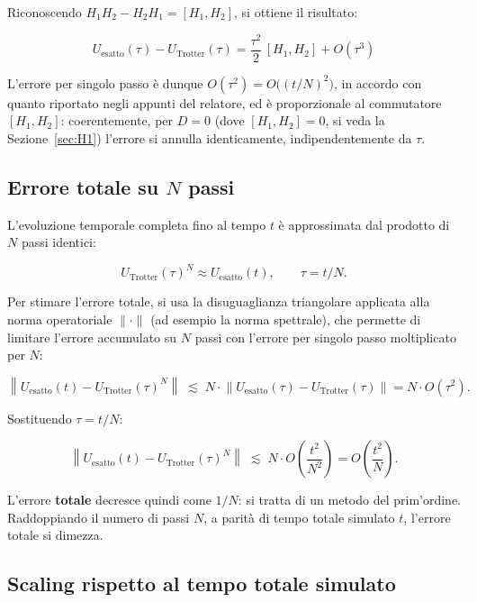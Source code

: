 \documentclass[11pt,a4paper]{article}
\begin{document}
Riconoscendo $H_1H_2-H_2H_1=[H_1,H_2]$, si ottiene il risultato:

\begin{equation}
\boxed{U_{\text{esatto}}(\tau) - U_{\text{Trotter}}(\tau) = \frac{\tau^2}{2}\,[H_1,H_2] + O(\tau^3)}
\end{equation}

L'errore per singolo passo è dunque $O(\tau^2)=O\big((t/N)^2\big)$, in accordo con quanto riportato negli appunti del relatore, ed è proporzionale al commutatore $[H_1,H_2]$: coerentemente, per $D=0$ (dove $[H_1,H_2]=0$, si veda la Sezione~\ref{sec:H1}) l'errore si annulla identicamente, indipendentemente da $\tau$.

\subsection{Errore totale su $N$ passi}

L'evoluzione temporale completa fino al tempo $t$ è approssimata dal prodotto di $N$ passi identici:

\begin{equation}
U_{\text{Trotter}}(\tau)^N \approx U_{\text{esatto}}(t), \qquad \tau = t/N.
\end{equation}

Per stimare l'errore totale, si usa la disuguaglianza triangolare applicata alla norma operatoriale $\|\cdot\|$ (ad esempio la norma spettrale), che permette di limitare l'errore accumulato su $N$ passi con l'errore per singolo passo moltiplicato per $N$:

\begin{equation}
\left\|U_{\text{esatto}}(t) - U_{\text{Trotter}}(\tau)^N\right\| \;\lesssim\; N \cdot \left\|U_{\text{esatto}}(\tau)-U_{\text{Trotter}}(\tau)\right\| = N\cdot O(\tau^2).
\end{equation}

Sostituendo $\tau=t/N$:

\begin{equation}
\left\|U_{\text{esatto}}(t) - U_{\text{Trotter}}(\tau)^N\right\| \;\lesssim\; N\cdot O\!\left(\frac{t^2}{N^2}\right) = O\!\left(\frac{t^2}{N}\right).
\end{equation}

L'errore \textbf{totale} decresce quindi come $1/N$: si tratta di un metodo del prim'ordine. Raddoppiando il numero di passi $N$, a parità di tempo totale simulato $t$, l'errore totale si dimezza.

\subsection{Scaling rispetto al tempo totale simulato}
\end{document}
